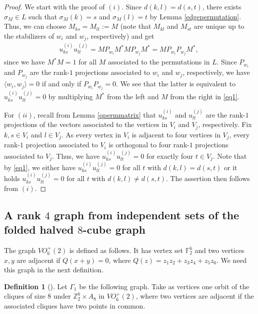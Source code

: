 \documentclass[11pt]{article}
\theoremstyle{definition}
\newtheorem{defi}[theo]{Definition}
\numberwithin{equation}{section}
\newcommand{\Z}{\mathbb{Z}}
\newcommand{\F}{\mathbb{F}}
\begin{document}
\begin{proof}
We start with the proof of $(i)$. Since $d(k,l)=d(s,t)$, there exists $\sigma_M\in L$ such that $\sigma_M(k)=s$ and $\sigma_M(l)=t$ by Lemma \ref{edgepermutation}. Thus, we can choose $M_{ks}=M_{lt}:=M$ (note that $M_{kl}$ and $M_{st}$ are unique up to the stabilizers of $w_i$ and $w_j$, respectively) and get
\begin{align}\label{eq1}
    u_{ks}^{(i)}u_{lt}^{(j)}=MP_{w_i}M^*MP_{w_j}M^*=MP_{w_i}P_{w_j}M^*,
\end{align}
since we have $M^*M=1$ for all $M$ associated to the permutations in $L$. Since $P_{w_i}$ and $P_{w_j}$ are the rank-$1$ projections associated to $w_i$ and $w_j$, respectively, we have $\langle w_i,w_j \rangle=0$ if and only if $P_{w_i}P_{w_j}=0$. We see that the latter is equivalent to $u_{ks}^{(i)}u_{lt}^{(j)}=0$ by multiplying $M^*$ from the left and $M$ from the right in \eqref{eq1}. 

For $(ii)$, recall from Lemma \ref{qpermmatrix} that $u_{ks}^{(i)}$ and $u_{lt}^{(j)}$ are the rank-$1$ projections of the vectors associated to the vertices in $V_i$ and $V_j$, respectively. Fix $k,s\in V_i$ and $l\in V_j$. As every vertex in $V_i$ is adjacent to four vertices in $V_j$, every rank-$1$ projection associated to $V_i$ is orthogonal to four rank-$1$ projections associated to $V_j$. Thus, we have $u_{ks}^{(i)}u_{lt}^{(j)}=0$ for exactly four $t\in V_j$. Note that by \eqref{eq1}, we either have $u_{ks}^{(i)}u_{lt}^{(j)}=0$ for all $t$ with $d(k,l)=d(s,t)$ or it holds $u_{ks}^{(i)}u_{lt}^{(j)}=0$ for all $t$ with $d(k,l)\neq d(s,t)$. The assertion then follows from $(i)$. 
\end{proof}

\subsection[Rank 4 graph]{A rank \texorpdfstring{$4$}{4} graph from independent sets of the folded halved \texorpdfstring{$8$}{8}-cube graph}

The graph $VO_6^+(2)$ is defined as follows. It has vertex set $\F_2^6$ and two vertices $x,y$ are adjacent if $Q(x+y)=0$, where $Q(z)=z_1z_2+z_3z_4+z_5z_6$. We need this graph in the next definition. 

\begin{defi}[\cite{BIK}]\label{rank4graph}
Let $\Gamma_1$ be the following graph. Take as vertices one orbit of the cliques of size $8$ under $\Z_2^6\times A_8$ in $VO_6^+(2)$, where two vertices are adjacent if the associated cliques have two points in common. 
\end{defi}
\end{document}
